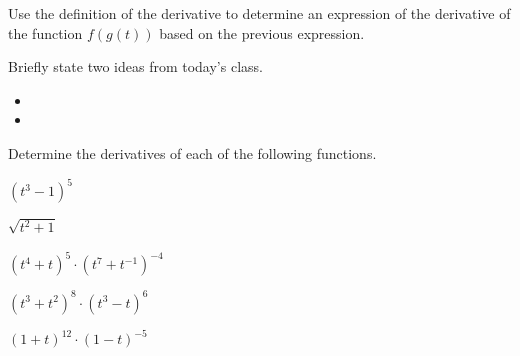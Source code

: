 \begin{problem}
\item Use the definition of the derivative to determine an expression
  of the derivative of the function $f(g(t))$ based on the previous
  expression.
  \vspace{5em}

\end{problem}


\postClass

\begin{problem}
\item Briefly state two ideas from today's class.
  \begin{itemize}
  \item 
  \item 
  \end{itemize}
\item Determine the derivatives of each of the following functions.
  \begin{subproblem}
  \item $(t^3-1)^5$
    \vfill
  \item $\sqrt{t^2+1}$
    \vfill
  \item $(t^4+t)^5\cdot (t^7+t^{-1})^{-4}$
    \vfill
  \item $(t^3+t^2)^8\cdot (t^3-t)^6$
    \vfill
  \item $(1+t)^{12}\cdot (1-t)^{-5}$
    \vfill
  \end{subproblem}
\end{problem}





